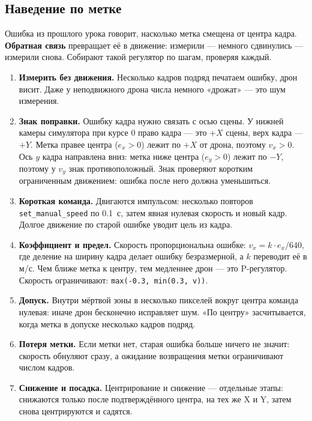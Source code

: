 \subsection{Наведение по метке}
\label{sec:python-visual-nav}

Ошибка из прошлого урока говорит, насколько метка смещена от центра кадра. \textbf{Обратная связь} превращает её в движение: измерили --- немного сдвинулись --- измерили снова. Собирают такой регулятор по шагам, проверяя каждый.

\begin{enumerate}
    \item \textbf{Измерить без движения.} Несколько кадров подряд печатаем ошибку, дрон висит. Даже у неподвижного дрона числа немного «дрожат» --- это шум измерения.
    \item \textbf{Знак поправки.} Ошибку кадра нужно связать с осью сцены. У нижней камеры симулятора при курсе 0 право кадра --- это $+X$ сцены, верх кадра --- $+Y$. Метка правее центра ($e_x > 0$) лежит по $+X$ от дрона, поэтому $v_x > 0$. Ось $y$ кадра направлена вниз: метка ниже центра ($e_y > 0$) лежит по $-Y$, поэтому у $v_y$ знак противоположный. Знак проверяют коротким ограниченным движением: ошибка после него должна уменьшиться.
    \item \textbf{Короткая команда.} Двигаются импульсом: несколько повторов \verb|set_manual_speed| по 0.1~с, затем явная нулевая скорость и новый кадр. Долгое движение по старой ошибке уводит цель из кадра.
    \item \textbf{Коэффициент и предел.} Скорость пропорциональна ошибке: $v_x = k \cdot e_x / 640$, где деление на ширину кадра делает ошибку безразмерной, а $k$ переводит её в м/с. Чем ближе метка к центру, тем медленнее дрон --- это P-регулятор. Скорость ограничивают: \verb|max(-0.3, min(0.3, v))|.
    \item \textbf{Допуск.} Внутри мёртвой зоны в несколько пикселей вокруг центра команда нулевая: иначе дрон бесконечно исправляет шум. «По центру» засчитывается, когда метка в допуске несколько кадров подряд.
    \item \textbf{Потеря метки.} Если метки нет, старая ошибка больше ничего не значит: скорость обнуляют сразу, а ожидание возвращения метки ограничивают числом кадров.
    \item \textbf{Снижение и посадка.} Центрирование и снижение --- отдельные этапы: снижаются только после подтверждённого центра, на тех же X и Y, затем снова центрируются и садятся.
\end{enumerate}

